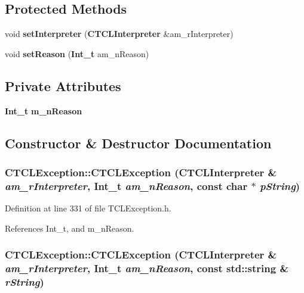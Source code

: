 \subsection*{Protected Methods}
\begin{CompactItemize}
\item 
void {\bf set\-Interpreter} ({\bf CTCLInterpreter} \&am\_\-r\-Interpreter)
\item 
void {\bf set\-Reason} ({\bf Int\_\-t} am\_\-n\-Reason)
\end{CompactItemize}
\subsection*{Private Attributes}
\begin{CompactItemize}
\item 
{\bf Int\_\-t} {\bf m\_\-n\-Reason}
\end{CompactItemize}


\subsection{Constructor \& Destructor Documentation}
\subsubsection{\setlength{\rightskip}{0pt plus 5cm}CTCLException::CTCLException ({\bf CTCLInterpreter} \& {\em am\_\-r\-Interpreter}, {\bf Int\_\-t} {\em am\_\-n\-Reason}, const char $\ast$ {\em p\-String})\hspace{0.3cm}{\tt  [inline]}}\label{classCTCLException_a0}




Definition at line 331 of file TCLException.h.

References Int\_\-t, and m\_\-n\-Reason.
\subsubsection{\setlength{\rightskip}{0pt plus 5cm}CTCLException::CTCLException ({\bf CTCLInterpreter} \& {\em am\_\-r\-Interpreter}, {\bf Int\_\-t} {\em am\_\-n\-Reason}, const std::string \& {\em r\-String})\hspace{0.3cm}{\tt  [inline]}}\label{classCTCLException_a1}




